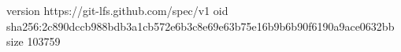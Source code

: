 version https://git-lfs.github.com/spec/v1
oid sha256:2c890dccb988bdb3a1cb572e6b3c8e69e63b75e16b9b6b90f6190a9ace0632bb
size 103759
